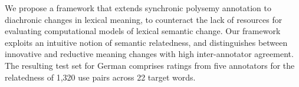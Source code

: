 We propose a framework that extends synchronic polysemy annotation to diachronic changes in lexical meaning, to counteract the lack of resources for evaluating computational models of lexical semantic change. Our framework exploits an intuitive notion of semantic relatedness, and distinguishes between innovative and reductive meaning changes with high inter-annotator agreement. The resulting test set for German comprises ratings from five annotators for the relatedness of 1,320 use pairs across 22 target words.
